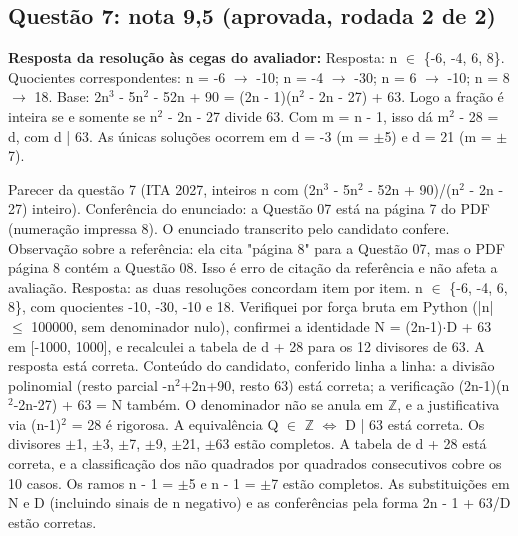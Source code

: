 \documentclass{article}%
\begin{document}
\subsection*{Questão 7: nota 9,5 (aprovada, rodada 2 de 2)}%
\textbf{Resposta da resolução às cegas do avaliador:} Resposta: n $\in$ \{-6, -4, 6, 8\}.\newline%
\newline%
Quocientes correspondentes: n = -6 $\to$ -10; n = -4 $\to$ -30; n = 6 $\to$ -10; n = 8 $\to$ 18.\newline%
\newline%
Base: 2n$^3$ - 5n$^2$ - 52n + 90 = (2n - 1)(n$^2$ - 2n - 27) + 63. Logo a fração é inteira se e somente se n$^2$ - 2n - 27 divide 63. Com m = n - 1, isso dá m$^2$ - 28 = d, com d | 63. As únicas soluções ocorrem em d = -3 (m = $\pm$5) e d = 21 (m = $\pm$7).\par %
Parecer da questão 7 (ITA 2027, inteiros n com (2n$^3$ - 5n$^2$ - 52n + 90)/(n$^2$ - 2n - 27) inteiro).\newline%
\newline%
Conferência do enunciado: a Questão 07 está na página 7 do PDF (numeração impressa 8). O enunciado transcrito pelo candidato confere. Observação sobre a referência: ela cita "página 8" para a Questão 07, mas o PDF página 8 contém a Questão 08. Isso é erro de citação da referência e não afeta a avaliação.\newline%
\newline%
Resposta: as duas resoluções concordam item por item. n $\in$ \{-6, -4, 6, 8\}, com quocientes -10, -30, -10 e 18. Verifiquei por força bruta em Python (|n| $\leq$ 100000, sem denominador nulo), confirmei a identidade N = (2n-1)$\cdot$D + 63 em {[}-1000, 1000{]}, e recalculei a tabela de d + 28 para os 12 divisores de 63. A resposta está correta.\newline%
\newline%
Conteúdo do candidato, conferido linha a linha: a divisão polinomial (resto parcial -n$^2$+2n+90, resto 63) está correta; a verificação (2n-1)(n$^2$-2n-27) + 63 = N também. O denominador não se anula em $\mathbb{Z}$, e a justificativa via (n-1)$^2$ = 28 é rigorosa. A equivalência Q $\in$ $\mathbb{Z}$ $\Leftrightarrow$ D | 63 está correta. Os divisores $\pm$1, $\pm$3, $\pm$7, $\pm$9, $\pm$21, $\pm$63 estão completos. A tabela de d + 28 está correta, e a classificação dos não quadrados por quadrados consecutivos cobre os 10 casos. Os ramos n - 1 = $\pm$5 e n - 1 = $\pm$7 estão completos. As substituições em N e D (incluindo sinais de n negativo) e as conferências pela forma 2n - 1 + 63/D estão corretas.\newline%
\end{document}

